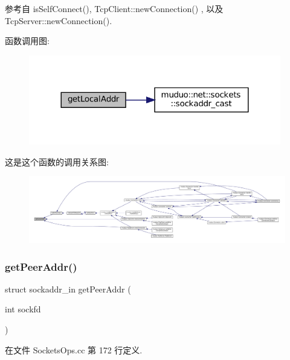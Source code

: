 参考自 is\+Self\+Connect(), Tcp\+Client\+::new\+Connection() , 以及 Tcp\+Server\+::new\+Connection().

函数调用图\+:
\nopagebreak
\begin{figure}[H]
\begin{center}
\leavevmode
\includegraphics[width=312pt]{namespacemuduo_1_1sockets_a4b4793e2d3f77da7bab38cfb52274075_cgraph}
\end{center}
\end{figure}
这是这个函数的调用关系图\+:
\nopagebreak
\begin{figure}[H]
\begin{center}
\leavevmode
\includegraphics[width=350pt]{namespacemuduo_1_1sockets_a4b4793e2d3f77da7bab38cfb52274075_icgraph}
\end{center}
\end{figure}
\mbox{\label{namespacemuduo_1_1sockets_ad095a2bf0c44507c945d04f8346f2817}} 
\subsubsection{\texorpdfstring{get\+Peer\+Addr()}{getPeerAddr()}}
{\footnotesize\ttfamily struct sockaddr\+\_\+in get\+Peer\+Addr (\begin{DoxyParamCaption}\item[{int}]{sockfd }\end{DoxyParamCaption})}



在文件 Sockets\+Ops.\+cc 第 172 行定义.



